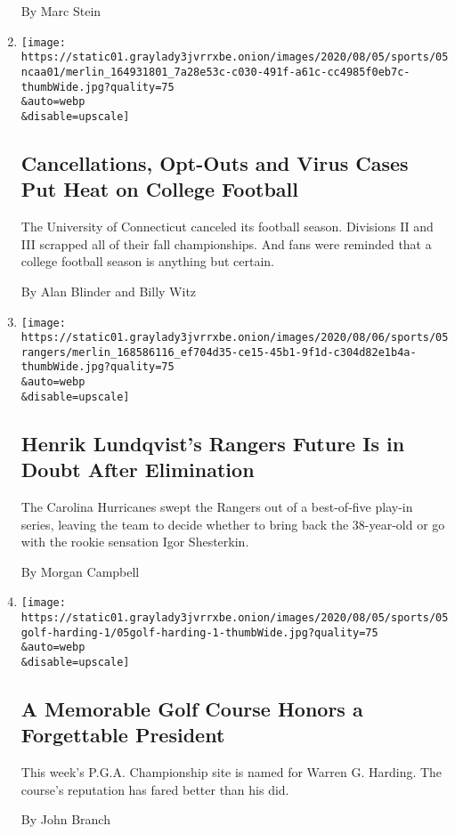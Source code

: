 \begin{enumerate}
  By Marc Stein
\item
  \href{/2020/08/05/sports/ncaafootball/coronavirus-uconn-cancels-football.html}{}

  \texttt{[image: https://static01.graylady3jvrrxbe.onion/images/2020/08/05/sports/05ncaa01/merlin\_164931801\_7a28e53c-c030-491f-a61c-cc4985f0eb7c-thumbWide.jpg?quality=75\\\&auto=webp\\\&disable=upscale]}

  \hypertarget{cancellations-opt-outs-and-virus-cases-put-heat-on-college-football}{%
  \subsection{Cancellations, Opt-Outs and Virus Cases Put Heat on
  College
  Football}\label{cancellations-opt-outs-and-virus-cases-put-heat-on-college-football}}

  The University of Connecticut canceled its football season. Divisions
  II and III scrapped all of their fall championships. And fans were
  reminded that a college football season is anything but certain.

  By Alan Blinder and Billy Witz
\item
  \href{/2020/08/05/sports/hockey/henrik-lundqvist-rangers-goalie.html}{}

  \texttt{[image: https://static01.graylady3jvrrxbe.onion/images/2020/08/06/sports/05rangers/merlin\_168586116\_ef704d35-ce15-45b1-9f1d-c304d82e1b4a-thumbWide.jpg?quality=75\\\&auto=webp\\\&disable=upscale]}

  \hypertarget{henrik-lundqvists-rangers-future-is-in-doubt-after-elimination}{%
  \subsection{Henrik Lundqvist's Rangers Future Is in Doubt After
  Elimination}\label{henrik-lundqvists-rangers-future-is-in-doubt-after-elimination}}

  The Carolina Hurricanes swept the Rangers out of a best-of-five
  play-in series, leaving the team to decide whether to bring back the
  38-year-old or go with the rookie sensation Igor Shesterkin.

  By Morgan Campbell
\item
  \href{/2020/08/05/sports/golf/pga-championship-harding-park.html}{}

  \texttt{[image: https://static01.graylady3jvrrxbe.onion/images/2020/08/05/sports/05golf-harding-1/05golf-harding-1-thumbWide.jpg?quality=75\\\&auto=webp\\\&disable=upscale]}

  \hypertarget{a-memorable-golf-course-honors-a-forgettable-president}{%
  \subsection{A Memorable Golf Course Honors a Forgettable
  President}\label{a-memorable-golf-course-honors-a-forgettable-president}}

  This week's P.G.A. Championship site is named for Warren G. Harding.
  The course's reputation has fared better than his did.

  By John Branch
\end{enumerate}

